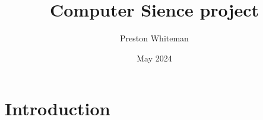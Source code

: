 \documentclass{article}[9pt]
\title{Computer Sience project}
\author{Preston Whiteman}
\date{May 2024}
\begin{document}
\maketitle

\section{Introduction}
\end{document}
